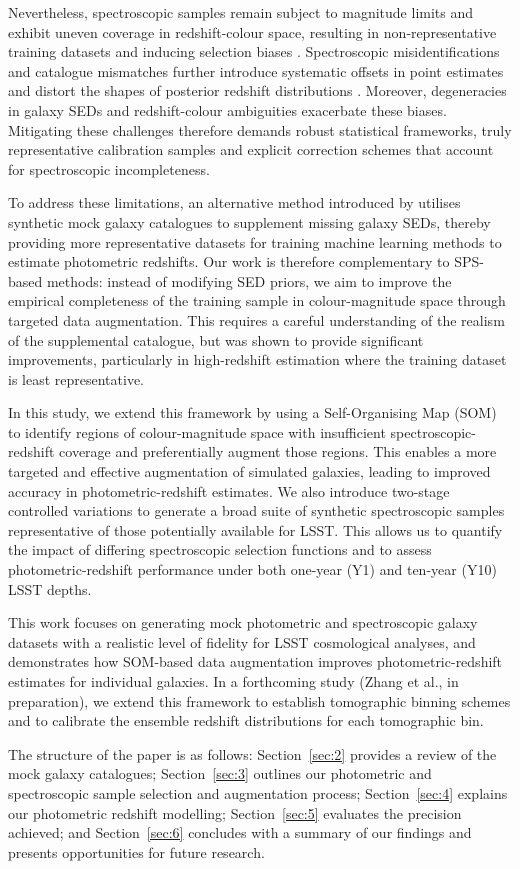 Nevertheless, spectroscopic samples remain subject to magnitude limits and exhibit uneven coverage in redshift-colour space, resulting in non‐representative training datasets and inducing selection biases \citep{2020A&A...637A.100W, 2020MNRAS.496.4769H}. Spectroscopic misidentifications and catalogue mismatches further introduce systematic offsets in point estimates and distort the shapes of posterior redshift distributions \citep{2015ApJ...813...53M, 2020MNRAS.496.4769H}. Moreover, degeneracies in galaxy SEDs and redshift-colour ambiguities exacerbate these biases. Mitigating these challenges therefore demands robust statistical frameworks, truly representative calibration samples and explicit correction schemes that account for spectroscopic incompleteness.

To address these limitations, an alternative method introduced by \citep{2024ApJ...967L...6M} utilises synthetic mock galaxy catalogues to supplement missing galaxy SEDs, thereby providing more representative datasets for training machine learning methods to estimate photometric redshifts. Our work is therefore complementary to SPS-based methods: instead of modifying SED priors, we aim to improve the empirical completeness of the training sample in colour-magnitude space through targeted data augmentation. This requires a careful understanding of the realism of the supplemental catalogue, but was shown to provide significant improvements, particularly in high-redshift estimation where the training dataset is least representative. 

In this study, we extend this framework by using a Self-Organising Map (SOM) to identify regions of colour-magnitude space with insufficient spectroscopic-redshift coverage and preferentially augment those regions. This enables a more targeted and effective augmentation of simulated galaxies, leading to improved accuracy in photometric-redshift estimates. We also introduce two-stage controlled variations to generate a broad suite of synthetic spectroscopic samples representative of those potentially available for LSST. This allows us to quantify the impact of differing spectroscopic selection functions and to assess photometric-redshift performance under both one-year (Y1) and ten-year (Y10) LSST depths.

This work focuses on generating mock photometric and spectroscopic galaxy datasets with a realistic level of fidelity for LSST cosmological analyses, and demonstrates how SOM-based data augmentation improves photometric-redshift estimates for individual galaxies. In a forthcoming study (Zhang et al., in preparation), we extend this framework to establish tomographic binning schemes and to calibrate the ensemble redshift distributions for each tomographic bin.

The structure of the paper is as follows: Section~\ref{sec:2} provides a review of the mock galaxy catalogues; Section~\ref{sec:3} outlines our photometric and spectroscopic sample selection and augmentation process; Section~\ref{sec:4} explains our photometric redshift modelling; Section~\ref{sec:5} evaluates the precision achieved; and Section~\ref{sec:6} concludes with a summary of our findings and presents opportunities for future research.